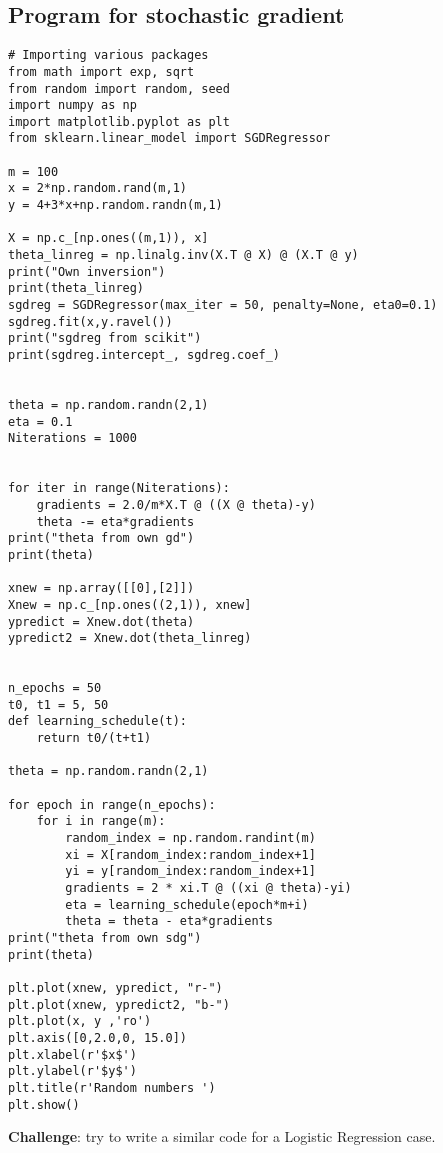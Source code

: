 \documentclass[%
oneside,                 %
final,                   %
10pt]{article}
\begin{document}
\subsection*{Program for stochastic gradient}

\begin{verbatim}
# Importing various packages
from math import exp, sqrt
from random import random, seed
import numpy as np
import matplotlib.pyplot as plt
from sklearn.linear_model import SGDRegressor

m = 100
x = 2*np.random.rand(m,1)
y = 4+3*x+np.random.randn(m,1)

X = np.c_[np.ones((m,1)), x]
theta_linreg = np.linalg.inv(X.T @ X) @ (X.T @ y)
print("Own inversion")
print(theta_linreg)
sgdreg = SGDRegressor(max_iter = 50, penalty=None, eta0=0.1)
sgdreg.fit(x,y.ravel())
print("sgdreg from scikit")
print(sgdreg.intercept_, sgdreg.coef_)


theta = np.random.randn(2,1)
eta = 0.1
Niterations = 1000


for iter in range(Niterations):
    gradients = 2.0/m*X.T @ ((X @ theta)-y)
    theta -= eta*gradients
print("theta from own gd")
print(theta)

xnew = np.array([[0],[2]])
Xnew = np.c_[np.ones((2,1)), xnew]
ypredict = Xnew.dot(theta)
ypredict2 = Xnew.dot(theta_linreg)


n_epochs = 50
t0, t1 = 5, 50
def learning_schedule(t):
    return t0/(t+t1)

theta = np.random.randn(2,1)

for epoch in range(n_epochs):
    for i in range(m):
        random_index = np.random.randint(m)
        xi = X[random_index:random_index+1]
        yi = y[random_index:random_index+1]
        gradients = 2 * xi.T @ ((xi @ theta)-yi)
        eta = learning_schedule(epoch*m+i)
        theta = theta - eta*gradients
print("theta from own sdg")
print(theta)

plt.plot(xnew, ypredict, "r-")
plt.plot(xnew, ypredict2, "b-")
plt.plot(x, y ,'ro')
plt.axis([0,2.0,0, 15.0])
plt.xlabel(r'$x$')
plt.ylabel(r'$y$')
plt.title(r'Random numbers ')
plt.show()

\end{verbatim}

\textbf{Challenge}: try to write a similar code for a Logistic Regression case.
\end{document}
